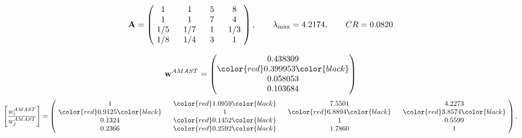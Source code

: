 \begin{example}
\begin{equation*}
\mathbf{A} =
\begin{pmatrix}
$\,\,$ 1 $\,\,$ & $\,\,$1$\,\,$ & $\,\,$5$\,\,$ & $\,\,$8 $\,\,$ \\
$\,\,$ 1 $\,\,$ & $\,\,$ 1 $\,\,$ & $\,\,$7$\,\,$ & $\,\,$4 $\,\,$ \\
$\,\,$ 1/5$\,\,$ & $\,\,$ 1/7$\,\,$ & $\,\,$ 1 $\,\,$ & $\,\,$ 1/3 $\,\,$ \\
$\,\,$ 1/8$\,\,$ & $\,\,$ 1/4$\,\,$ & $\,\,$3$\,\,$ & $\,\,$ 1  $\,\,$ \\
\end{pmatrix},
\qquad
\lambda_{\max} =
4.2174,
\qquad
CR = 0.0820
\end{equation*}

\begin{equation*}
\mathbf{w}^{AMAST} =
\begin{pmatrix}
0.438309\\
\color{red} 0.399953\color{black} \\
0.058053\\
0.103684
\end{pmatrix}\end{equation*}
\begin{equation*}
\left[ \frac{{w}^{AMAST}_i}{{w}^{AMAST}_j} \right] =
\begin{pmatrix}
$\,\,$ 1 $\,\,$ & $\,\,$\color{red} 1.0959\color{black} $\,\,$ & $\,\,$7.5501$\,\,$ & $\,\,$4.2273$\,\,$ \\
$\,\,$\color{red} 0.9125\color{black} $\,\,$ & $\,\,$ 1 $\,\,$ & $\,\,$\color{red} 6.8894\color{black} $\,\,$ & $\,\,$\color{red} 3.8574\color{black}   $\,\,$ \\
$\,\,$0.1324$\,\,$ & $\,\,$\color{red} 0.1452\color{black} $\,\,$ & $\,\,$ 1 $\,\,$ & $\,\,$0.5599 $\,\,$ \\
$\,\,$0.2366$\,\,$ & $\,\,$\color{red} 0.2592\color{black} $\,\,$ & $\,\,$1.7860$\,\,$ & $\,\,$ 1  $\,\,$ \\
\end{pmatrix},
\end{equation*}


\end{example}
